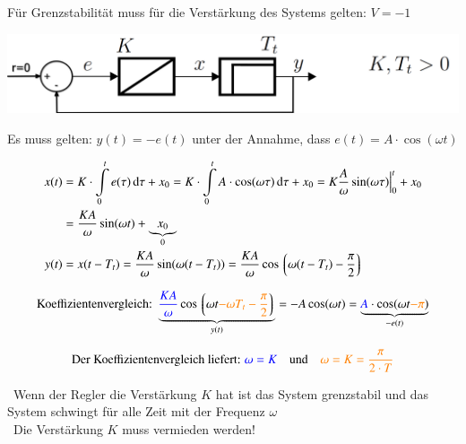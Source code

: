     Für Grenzstabilität muss für die Verstärkung des Systems gelten: $V = -1$ 



    \begin{center}
        \includegraphics[align=center, width=0.75\columnwidth]{images/gegengekoppeltes_system.png}
    \end{center}

    Es muss gelten: $y(t) = -e(t)$ unter der Annahme, dass $e(t) = A \cdot \cos(\omega t)$

    \vspace*{-0.3cm}        %

    \begin{align*}
        x(t) &= K \cdot \int\limits_0^t e(\tau) \mathop{} \! \mathrm{d} \tau + x_0 
            = K \cdot \int\limits_0^t A \cdot \cos(\omega \tau) \mathop{} \! \mathrm{d} \tau + x_0
            = K \frac{A}{\omega} \sin(\omega \tau) \Big|_0^t + x_0 \\
            &= \frac{K A}{\omega} \sin(\omega t) + \underbrace{x_0}_{0} \\
        y(t) &= x(t - T_t) = \frac{K A}{\omega} \sin(\omega (t - T_t)) = \frac{K A}{\omega} \cos \left\lgroup \omega( t- T_t) - \frac{\pi}{2}  \right\rgroup
    \end{align*}

 

    $$ \text{Koeffizientenvergleich: } \underbrace{ {\color{blue} \frac{K A}{\omega}} \cos \left\lgroup \omega t {\color{orange}- \omega T_t - \frac{\pi}{2}} \right\rgroup }_{y(t)}
         = - A \cos(\omega t) = \underbrace{ {\color{blue}A} \cdot \cos(\omega t {\color{orange}- \pi}) }_{-e(t)} $$
    
    $$ \text{Der Koeffizientenvergleich liefert: } {\color{blue}\omega = K} \quad \text{und} \quad {\color{orange}\omega = K = \frac{\pi}{2 \cdot T}} $$

    \textrightarrow\ Wenn der Regler die Verstärkung $K$ hat ist das System grenzstabil 
    und das System schwingt für alle Zeit mit der Frequenz $\omega$\\
    \textrightarrow\ Die Verstärkung $K$ muss vermieden werden!

    